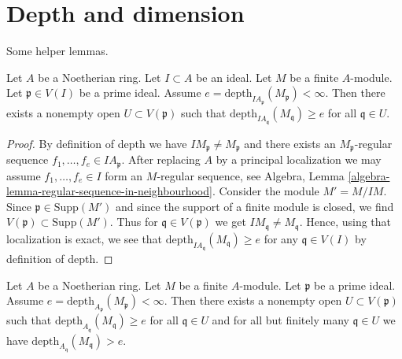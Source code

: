 \section{Depth and dimension}
\label{section-dept-dimension}

\noindent
Some helper lemmas.

\begin{lemma}
\label{lemma-ideal-depth-function}
Let $A$ be a Noetherian ring. Let $I \subset A$ be an ideal.
Let $M$ be a finite $A$-module. Let $\mathfrak p \in V(I)$
be a prime ideal. Assume
$e = \text{depth}_{IA_\mathfrak p}(M_\mathfrak p) < \infty$.
Then there exists a nonempty open $U \subset V(\mathfrak p)$
such that $\text{depth}_{IA_\mathfrak q}(M_\mathfrak q) \geq e$
for all $\mathfrak q \in U$.
\end{lemma}

\begin{proof}
By definition of depth we have $IM_\mathfrak p \not = M_\mathfrak p$
and there exists an $M_\mathfrak p$-regular sequence
$f_1, \ldots, f_e \in IA_\mathfrak p$. After replacing $A$ by
a principal localization we may assume $f_1, \ldots, f_e \in I$
form an $M$-regular sequence, see
Algebra, Lemma \ref{algebra-lemma-regular-sequence-in-neighbourhood}.
Consider the module $M' = M/IM$. Since $\mathfrak p \in \text{Supp}(M')$
and since the support of a finite module is closed, we find
$V(\mathfrak p) \subset \text{Supp}(M')$. Thus
for $\mathfrak q \in V(\mathfrak p)$ we get
$IM_\mathfrak q \not = M_\mathfrak q$. Hence, using that
localization is exact, we see that
$\text{depth}_{IA_\mathfrak q}(M_\mathfrak q) \geq e$
for any $\mathfrak q \in V(I)$ by definition of depth.
\end{proof}

\begin{lemma}
\label{lemma-depth-function}
Let $A$ be a Noetherian ring. Let $M$ be a finite $A$-module.
Let $\mathfrak p$ be a prime ideal. Assume
$e = \text{depth}_{A_\mathfrak p}(M_\mathfrak p) < \infty$.
Then there exists a nonempty open $U \subset V(\mathfrak p)$
such that $\text{depth}_{A_\mathfrak q}(M_\mathfrak q) \geq e$
for all $\mathfrak q \in U$ and
for all but finitely many $\mathfrak q \in U$ we have
$\text{depth}_{A_\mathfrak q}(M_\mathfrak q) > e$.
\end{lemma}


